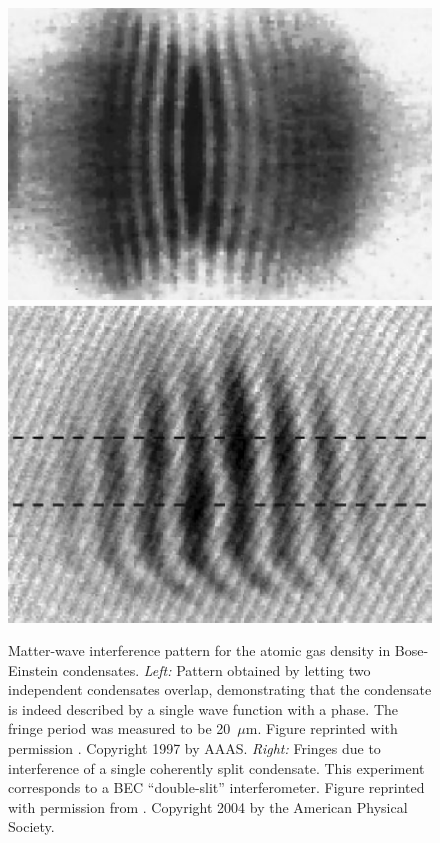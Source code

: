 \documentclass[twocolumn,aps,floatfix,amsmath,amssymb,showpacs,nofootinbib]{revtex4}
\begin{document}
\begin{figure}
\begin{center}
  \includegraphics[scale=.218]{bec-interference-n.eps}
  \includegraphics[scale=.2]{bec-doubleslit-n.eps}
\end{center}
\caption[Matter-wave interference pattern for the atomic gas
density in Bose-Einstein condensates]{\label{fig:bec1} Matter-wave
  interference pattern for the atomic gas density in Bose-Einstein
  condensates. {\it Left:} Pattern obtained by letting two independent
  condensates overlap, demonstrating that the condensate is indeed
  described by a single wave function with a phase. The fringe period
  was measured to be 20~$\mu$m. Figure reprinted with permission
  \cite{Andrews:1997:um}. Copyright 1997 by AAAS. {\it Right:}
  Fringes due to interference of a single coherently split condensate.
  This experiment corresponds to a BEC ``double-slit'' interferometer.
  Figure reprinted with permission from \cite{Shin:2004:lo}.
  Copyright 2004 by the American Physical Society.  }
\end{figure}
\end{document}
